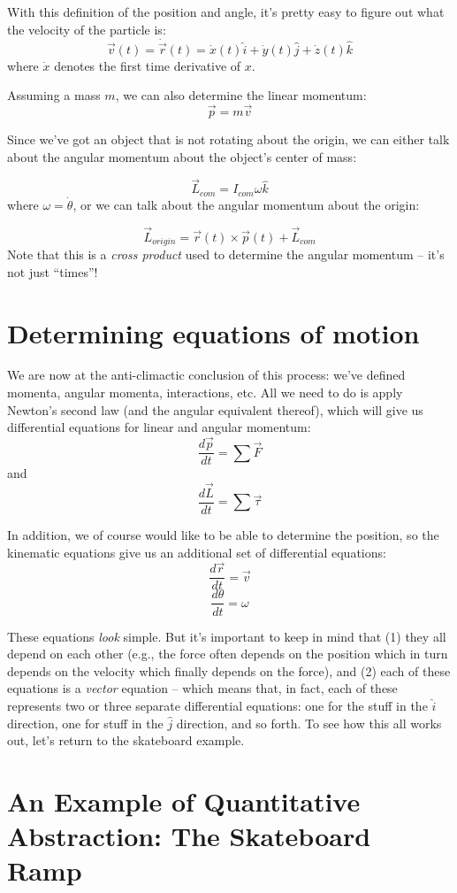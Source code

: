 With this definition of the position and angle, it's pretty easy to figure out what the velocity of the particle is:
$$\vec{v}(t) = \dot{\vec{r}}(t) = \dot{x}(t) \hat{i} + \dot{y}(t) \hat{j} + \dot{z}(t) \hat{k}$$
where $\dot{x}$ denotes the first time derivative of $x$.  

Assuming a mass $m$, we can also determine the linear momentum:$$\vec{p} = m\vec{v}$$

Since we've got an object that is not rotating about the origin, we can either talk about the angular momentum about the object's center of mass:

$$\vec{L}_{com} = I_{com} \omega \hat{k}$$
where $\omega = \dot{\theta}$, or we can talk about the angular momentum about the origin:

$$\vec{L}_{origin} = \vec{r}(t) \times \vec{p}(t) + \vec{L}_{com}$$
Note that this is a {\it cross product} used to determine the angular momentum -- it's not just ``times''!
\section{Determining equations of motion}

We are now at the anti-climactic conclusion of this process:  we've defined momenta, angular momenta, interactions, etc.  All we need to do is apply Newton's second law (and the angular equivalent thereof), which will give us differential equations for linear and angular momentum:
$$\frac{d\vec{p}}{dt} = \sum \vec{F}$$
and
$$\frac{d \vec{L}}{dt} = \sum \vec{\tau}$$

In addition, we of course would like to be able to determine the position, so the kinematic equations give us an additional set of differential equations:
$$\frac{d\vec{r}}{dt} = \vec{v}$$
$$\frac{d\theta}{dt} = \omega$$


These equations {\it look} simple. But it's important to keep in mind that (1) they all depend on each other (e.g., the force often depends on the position which in turn depends on the velocity which finally depends on the force), and (2) each of these equations is a {\it vector} equation -- which means that, in fact, each of these represents two or three separate differential equations:  one for the stuff in the $\hat{i} $ direction, one for stuff in the $\hat{j}$ direction, and so forth. To see how this all works out, let's return to the skateboard example.


\section{An Example of Quantitative Abstraction: The Skateboard Ramp}


